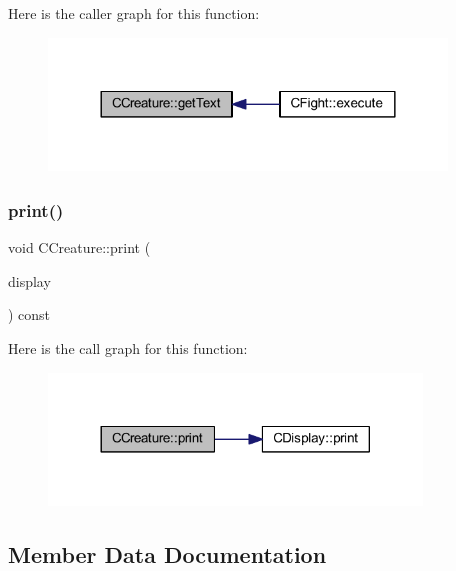 Here is the caller graph for this function\+:\nopagebreak
\begin{figure}[H]
\begin{center}
\leavevmode
\includegraphics[width=300pt]{class_c_creature_a876396dce2bd6e42c09bb9edc72ed0ba_icgraph}
\end{center}
\end{figure}
\mbox{\label{class_c_creature_a3ea9f0e5ace386bd5ff46555374d192d}} 
\subsubsection{\texorpdfstring{print()}{print()}}
{\footnotesize\ttfamily void C\+Creature\+::print (\begin{DoxyParamCaption}\item[{const \mbox{\hyperlink{class_c_display}{C\+Display}} \&}]{display }\end{DoxyParamCaption}) const\hspace{0.3cm}{\ttfamily [inline]}}

Here is the call graph for this function\+:\nopagebreak
\begin{figure}[H]
\begin{center}
\leavevmode
\includegraphics[width=281pt]{class_c_creature_a3ea9f0e5ace386bd5ff46555374d192d_cgraph}
\end{center}
\end{figure}


\subsection{Member Data Documentation}
\mbox{\label{class_c_creature_a1390ddb23849de09d8ad815adeb3bd8f}} 
